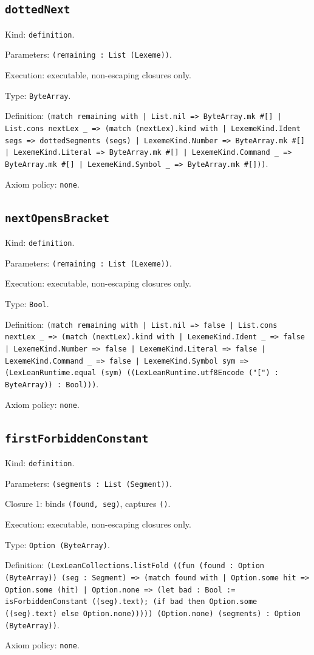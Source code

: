 \documentclass[11pt]{article}
\begin{document}
\subsection*{\texttt{dottedNext}}
\noindent Kind: \texttt{definition}.\par
\noindent Parameters: \texttt{(remaining : List (Lexeme))}.\par
\noindent Execution: executable, non-escaping closures only.\par
\noindent Type: \texttt{ByteArray}.\par
\noindent Definition: \texttt{(match remaining with | List.nil => ByteArray.mk \#[] | List.cons nextLex \_ => (match (nextLex).kind with | LexemeKind.Ident segs => dottedSegments (segs) | LexemeKind.Number => ByteArray.mk \#[] | LexemeKind.Literal => ByteArray.mk \#[] | LexemeKind.Command \_ => ByteArray.mk \#[] | LexemeKind.Symbol \_ => ByteArray.mk \#[]))}.\par
\noindent Axiom policy: \texttt{none}.\par
\subsection*{\texttt{nextOpensBracket}}
\noindent Kind: \texttt{definition}.\par
\noindent Parameters: \texttt{(remaining : List (Lexeme))}.\par
\noindent Execution: executable, non-escaping closures only.\par
\noindent Type: \texttt{Bool}.\par
\noindent Definition: \texttt{(match remaining with | List.nil => false | List.cons nextLex \_ => (match (nextLex).kind with | LexemeKind.Ident \_ => false | LexemeKind.Number => false | LexemeKind.Literal => false | LexemeKind.Command \_ => false | LexemeKind.Symbol sym => (LexLeanRuntime.equal (sym) ((LexLeanRuntime.utf8Encode ("[") : ByteArray)) : Bool)))}.\par
\noindent Axiom policy: \texttt{none}.\par
\subsection*{\texttt{firstForbiddenConstant}}
\noindent Kind: \texttt{definition}.\par
\noindent Parameters: \texttt{(segments : List (Segment))}.\par
\noindent Closure 1: binds \texttt{(found, seg)}, captures \texttt{()}.\par
\noindent Execution: executable, non-escaping closures only.\par
\noindent Type: \texttt{Option (ByteArray)}.\par
\noindent Definition: \texttt{(LexLeanCollections.listFold ((fun (found : Option (ByteArray)) (seg : Segment) => (match found with | Option.some hit => Option.some (hit) | Option.none => (let bad : Bool := isForbiddenConstant ((seg).text); (if bad then Option.some ((seg).text) else Option.none))))) (Option.none) (segments) : Option (ByteArray))}.\par
\noindent Axiom policy: \texttt{none}.\par
\end{document}
